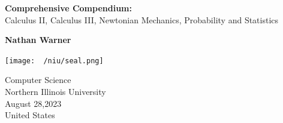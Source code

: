 \documentclass{report}
\title{\Huge{}}
\author{\huge{Nathan Warner}}
\date{\huge{}}
\begin{document}
        \begin{titlepage}
       \begin{center}
           \vspace*{1cm}
    
           \textbf{Comprehensive Compendium:} \\
            Calculus II, Calculus III, Newtonian Mechanics, Probability and Statistics
    
           \vspace{0.5cm}
            
                
           \vspace{1.5cm}
    
           \textbf{Nathan Warner}
    
           \vfill
                
                
           \vspace{0.8cm}
         
           \texttt{[image: ~/niu/seal.png]}
                
           Computer Science \\
           Northern Illinois University\\
           August 28,2023 \\
           United States\\
           
                
       \end{center}
    \end{titlepage}
    \tableofcontents
    \pagebreak \bigbreak \noindent
    \bigbreak \noindent 

    \bigbreak \noindent 
\end{document}
